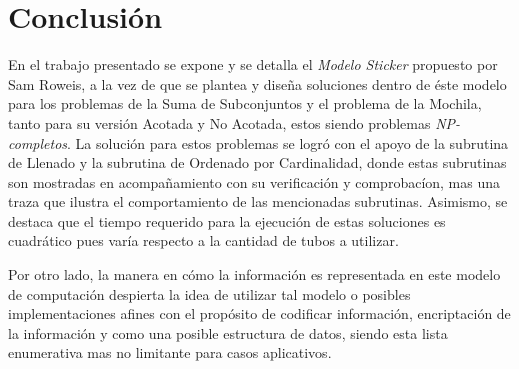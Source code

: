 \documentclass[12pt, letterpaper, twoside]{article}
\begin{document}
    \section{Conclusión}
    En el trabajo presentado se expone y se detalla el \emph{Modelo Sticker}\autocite{sticker_model} propuesto por Sam Roweis, a la vez de que se plantea y diseña soluciones dentro de éste modelo para los problemas de la Suma de Subconjuntos y el problema de la Mochila, tanto para su versión Acotada y No Acotada, estos siendo problemas \emph{NP-completos}. La solución para estos problemas se logró con el apoyo de la subrutina de Llenado y la subrutina de Ordenado por Cardinalidad, donde estas subrutinas son mostradas en acompañamiento con su verificación y comprobacíon, mas una traza que ilustra el comportamiento de las mencionadas subrutinas. Asimismo, se destaca que el tiempo requerido para la ejecución de estas soluciones es cuadrático pues varía respecto a la cantidad de tubos a utilizar. 


    Por otro lado, la manera en cómo la información es representada en este modelo de computación despierta la idea de utilizar tal modelo o posibles implementaciones afines con el propósito de codificar información, encriptación de la información y como una posible estructura de datos, siendo esta lista enumerativa mas no limitante para casos aplicativos.

    \newpage
    \printbibliography
\end{document}
